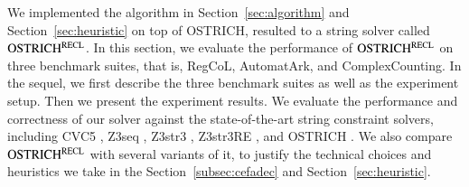 
We implemented the algorithm in Section~\ref{sec:algorithm} and Section~\ref{sec:heuristic} on top of OSTRICH, resulted to a string solver called $\rm OSTRICH^{RECL}$. 
%
In this section, we evaluate the performance of $\rm OSTRICH^{RECL}$ on three benchmark suites, that is, RegCoL, AutomatArk, and ComplexCounting. In the sequel, we first describe the three benchmark suites as well as the experiment setup. Then we present the experiment results. We evaluate the performance and correctness of our solver against the state-of-the-art string constraint solvers, including CVC5 \cite{cvc5}, Z3seq \cite{z3seq}, Z3str3 \cite{Z3-str3}, Z3str3RE \cite{BD+23}, and OSTRICH \cite{CHL+19}. We also compare $\rm OSTRICH^{RECL}$ with several variants of it, to justify the technical choices and heuristics we take in the Section~\ref{subsec:cefadec} and Section~\ref{sec:heuristic}.

 





